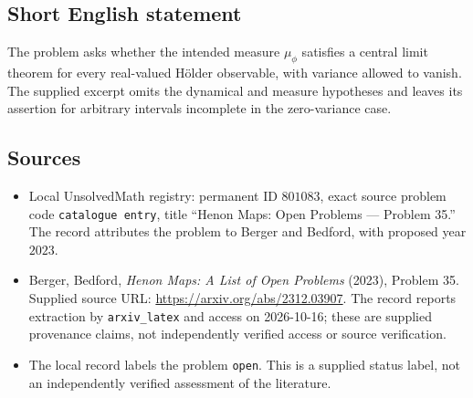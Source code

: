 \documentclass[11pt]{article}
\begin{document}
\subsection{Short English statement}
The problem asks whether the intended measure $\mu_\phi$ satisfies a central limit theorem for every real-valued H\"older observable, with variance allowed to vanish. The supplied excerpt omits the dynamical and measure hypotheses and leaves its assertion for arbitrary intervals incomplete in the zero-variance case.
\subsection{Sources}
\begin{itemize}
\item Local UnsolvedMath registry: permanent ID $801083$, exact source problem code \texttt{catalogue entry}, title ``Henon Maps: Open Problems --- Problem 35.'' The record attributes the problem to Berger and Bedford, with proposed year $2023$.
\item Berger, Bedford, \emph{Henon Maps: A List of Open Problems} (2023), Problem 35. Supplied source URL: \url{https://arxiv.org/abs/2312.03907}. The record reports extraction by \texttt{arxiv\_latex} and access on 2026-10-16; these are supplied provenance claims, not independently verified access or source verification.
\item The local record labels the problem \texttt{open}. This is a supplied status label, not an independently verified assessment of the literature.
\end{itemize}
\end{document}
